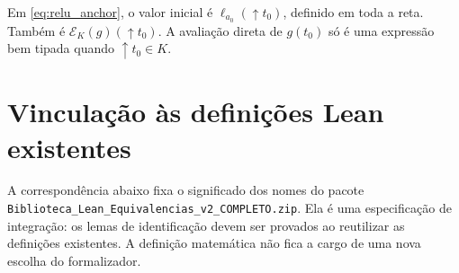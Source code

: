 \documentclass[11pt,a4paper]{article}
\newcommand{\code}[1]{\nolinkurl{#1}}
\begin{document}
Em \eqref{eq:relu_anchor}, o valor inicial é
$\ell_{a_0}(\uparrow t_0)$, definido em toda a reta. Também é
$\mathcal E_K(g)(\uparrow t_0)$. A avaliação direta de $g(t_0)$
só é uma expressão bem tipada quando $\uparrow t_0\in K$.

\appendix
\section{Vinculação às definições Lean existentes}
\label{sec:adapters}

A correspondência abaixo fixa o significado dos nomes do pacote
\code{Biblioteca_Lean_Equivalencias_v2_COMPLETO.zip}. Ela é uma
especificação de integração: os lemas de identificação devem ser
provados ao reutilizar as definições existentes. A definição matemática
não fica a cargo de uma nova escolha do formalizador.
\end{document}

